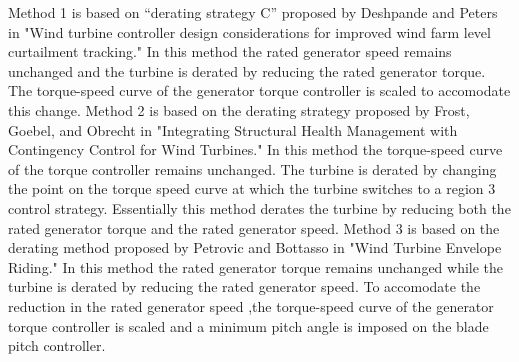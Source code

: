 Method 1 is based on “derating strategy C” proposed by Deshpande and Peters in "Wind turbine controller design considerations for improved wind farm level curtailment tracking."\cite{deshpande2012} In this method the rated generator speed remains unchanged and the turbine is derated by reducing the rated generator torque. The torque-speed curve of the generator torque controller is scaled to accomodate this change. Method 2 is based on the derating strategy proposed by Frost, Goebel, and Obrecht in "Integrating Structural Health Management with Contingency Control for Wind Turbines."\cite{frost2013} In this method the torque-speed curve of the torque controller remains unchanged. The turbine is derated by changing the point on the torque speed curve at which the turbine switches to a region 3 control strategy. Essentially this method derates the turbine by reducing both the rated generator torque and the rated generator speed. Method 3 is based on the derating method proposed by Petrovic and Bottasso in "Wind Turbine Envelope Riding."\cite{petrovic2015} In this method the rated generator torque remains unchanged while the turbine is derated by reducing the rated generator speed. To accomodate the reduction in the rated generator speed ,the torque-speed curve of the generator torque controller is scaled and a minimum pitch angle is imposed on the blade pitch controller.



